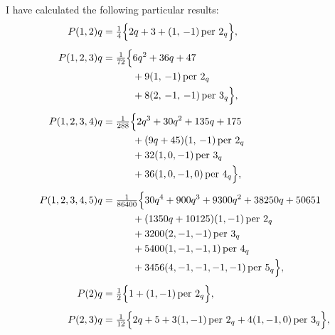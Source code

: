 \documentclass[11pt]{article}
\begin{document}
I have calculated the following particular results:
\begin{align*}
P(1, 2)q &= \tfrac{1}{4}\Bigl\{2q + 3 + (1,\,-1)\,\text{per }2_q\Bigr\}, \\[1ex]
P(1, 2, 3)q &= \tfrac{1}{72}\Bigl\{6q^2 + 36q + 47 \\
&\qquad\quad + 9(1,\,-1)\,\text{per }2_q \\
&\qquad\quad + 8(2,\,-1,\,-1)\,\text{per }3_q\Bigr\}, \\[1ex]
P(1, 2, 3, 4)q &= \tfrac{1}{288}\Bigl\{2 q^3 + 30 q^2 + 135 q + 175 \\
&\qquad\quad + (9q + 45)(1,\,-1)\,\text{per }2_q \\
&\qquad\quad + 32 (1, 0, -1)\,\text{per }3_q \\
&\qquad\quad + 36 (1, 0, -1, 0)\,\text{per }4_q\Bigr\}, \\[1ex]
P(1, 2, 3, 4, 5)q &= \tfrac{1}{86400}\Bigl\{30 q^4 + 900 q^3 + 9300 q^2 + 38250 q + 50651 \\
&\qquad\quad + (1350 q + 10125)(1, -1)\,\text{per }2_q \\
&\qquad\quad + 3200 (2, -1, -1)\,\text{per }3_q \\
&\qquad\quad + 5400 (1, -1, -1, 1)\,\text{per }4_q \\
&\qquad\quad + 3456 (4, -1, -1, -1, -1)\,\text{per }5_q\Bigr\}, \\[1ex]
P(2)q &= \tfrac{1}{2}\Bigl\{1 + (1, -1)\,\text{per }2_q\Bigr\}, \\[1ex]
P(2, 3)q &= \tfrac{1}{12}\Bigl\{2q + 5 + 3 (1, -1)\,\text{per }2_q + 4 (1, -1, 0)\,\text{per }3_q\Bigr\},
\end{align*}
\end{document}
